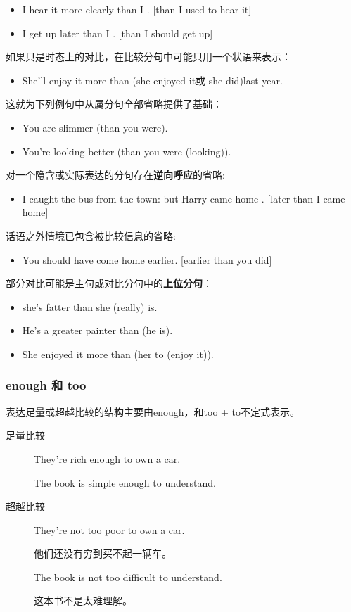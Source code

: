 \begin{itemize}
\item I hear it more clearly than I . [than I used to hear it]

\item I get up later than I . [than I should get up]
\end{itemize}

如果只是时态上的对比，在比较分句中可能只用一个状语来表示：
\begin{itemize}
\item She'll enjoy it more than (she enjoyed it或 she did)last year.
\end{itemize}
这就为下列例句中从属分句全部省略提供了基础：
\begin{itemize}
\item You are slimmer (than you were).
\item You're looking better (than you were (looking)).
\end{itemize}

对一个隐含或实际表达的分句存在\textbf{逆向呼应}的省略:
\begin{itemize}
\item I caught the bus from the town: but Harry came home . [later than I came home]
\end{itemize}


话语之外情境已包含被比较信息的省略:
\begin{itemize}
\item You should have come home earlier. [earlier than you did]
\end{itemize}

部分对比可能是主句或对比分句中的\textbf{上位分句}：
\begin{itemize}
\item {} she's fatter than she (really) is.
\item He's a greater painter than  (he is).
\item She enjoyed it more than  (her to (enjoy it)).
\end{itemize}

\subsubsection{enough 和 too}

表达足量或超越比较的结构主要由enough，和too + to不定式表示。
\begin{description}
\item[足量比较] They're rich enough to own a car.

  The book is simple enough to understand.

\item[超越比较] They're not too poor to own a car.

  他们还没有穷到买不起一辆车。

  The book is not too difficult to understand.

  这本书不是太难理解。
\end{description}

